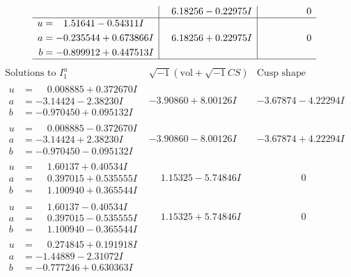 \documentclass[1p]{elsarticle_modified}
\theoremstyle{definition}
\newcommand{\I}{\sqrt{-1}}
\begin{document}
$$\begin{array}{c|c|c}
 & \phantom{-}6.18256 - 0.22975 I & \phantom{-0.000000 } 0 \\ \hline\begin{aligned}
u &= \phantom{-}1.51641 - 0.54311 I \\
a &= -0.235544 + 0.673866 I \\
b &= -0.899912 + 0.447513 I\end{aligned}
 & \phantom{-}6.18256 + 0.22975 I & \phantom{-0.000000 } 0\\
 \hline 
 \end{array}$$\newpage$$\begin{array}{c|c|c}  
\text{Solutions to }I^u_{1}& \I (\text{vol} + \sqrt{-1}CS) & \text{Cusp shape}\\
 \hline 
\begin{aligned}
u &= \phantom{-}0.008885 + 0.372670 I \\
a &= -3.14424 - 2.38230 I \\
b &= -0.970450 + 0.095132 I\end{aligned}
 & -3.90860 + 8.00126 I & -3.67874 - 4.22294 I \\ \hline\begin{aligned}
u &= \phantom{-}0.008885 - 0.372670 I \\
a &= -3.14424 + 2.38230 I \\
b &= -0.970450 - 0.095132 I\end{aligned}
 & -3.90860 - 8.00126 I & -3.67874 + 4.22294 I \\ \hline\begin{aligned}
u &= \phantom{-}1.60137 + 0.40534 I \\
a &= \phantom{-}0.397015 + 0.535555 I \\
b &= \phantom{-}1.100940 + 0.365544 I\end{aligned}
 & \phantom{-}1.15325 - 5.74846 I & \phantom{-0.000000 } 0 \\ \hline\begin{aligned}
u &= \phantom{-}1.60137 - 0.40534 I \\
a &= \phantom{-}0.397015 - 0.535555 I \\
b &= \phantom{-}1.100940 - 0.365544 I\end{aligned}
 & \phantom{-}1.15325 + 5.74846 I & \phantom{-0.000000 } 0 \\ \hline\begin{aligned}
u &= \phantom{-}0.274845 + 0.191918 I \\
a &= -1.44889 - 2.31072 I \\
b &= -0.777246 + 0.630363 I\end{aligned}

\end{array}$$
\end{document}
